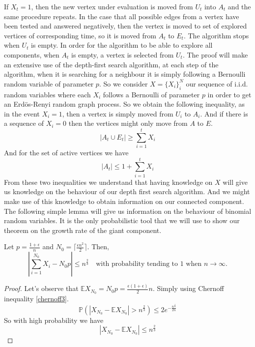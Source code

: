 If $X_t = 1$, then the new vertex under evaluation is moved from $U_t$ into $A_t$ and the same procedure repeats. 
In the case that all possible edges from a vertex have been tested and answered negatively, then the vertex is moved to set of explored vertices of corresponding time, so it is moved from $A_t$ to $E_t$.
The algorithm stops when $U_t$ is empty.
\newline
In order for the algorithm to be able to explore all components, when $A_t$ is empty, a vertex is selected from $U_t$.
\newline
The proof will make an extensive use of the depth-first search algorithm, at each step of the algorithm, when it is searching for a neighbour it is simply following a Bernoulli random variable of parameter $p$.
So we consider $X = \{X_i\}_i^N$ our sequence of i.i.d. random variables where each $X_i$ follows a Bernoulli of parameter $p$ in order to get an Erd\"os-Renyi random graph process.
So we obtain the following inequality, as in the event $X_i = 1$, then a vertex is simply moved from $U_i$ to $A_i$. And if there is a sequence of $X_i = 0$ then the vertices might only move from $A$ to $E$.  
\begin{equation}
	|A_t \cup E_t| \geq \sum_{i=1}^t X_i
\end{equation} 
And for the set of active vertices we have
\begin{equation}\label{eq:At}
	|A_t| \leq 1 + \sum_{i=1}^t X_i
\end{equation}
From these two inequalities we understand that having knowledge on $X$ will give us knowledge on the behaviour of our depth first search algorithm. And we might make use of this knowledge to obtain information on our connected component.
\newline
The following simple lemma will give us information on the behaviour of binomial random variables. It is the only probabilistic tool that we will use to show our theorem on the growth rate of the giant component.
\begin{lemma}\label{lemmaN0}
	Let $p = \frac{1+\epsilon}{n}$ and $N_0 = \lceil\frac{\epsilon n^2}{2}\rceil$. Then, 
	\begin{equation}
	|\sum_{i=1}^{N_0} X_{i} - N_0 p| \leq n^{\frac{2}{3}} \quad \text{with probability tending to 1 when $n\to \infty$.}
	\end{equation}
\end{lemma}
\begin{proof}
	Let's observe that $\mathbb{E}X_{N_0} = N_0 p = \frac{\epsilon(1+\epsilon)}{2}n$.
	Simply using Chernoff inequality \eqref{chernoff3}.
	\begin{equation}
		\mathbb{P}(|X_{N_0} - \mathbb{E}X_{N_0}| > n^{\frac{2}{3}} ) \leq 2 e^{-\frac{n^{\frac{4}{3}}}{2n}}
	\end{equation}
	So with high probability we have 
	\begin{equation}
		|X_{N_0} - \mathbb{E}X_{N_0}| \leq n^{\frac{2}{3}}
	\end{equation}
\end{proof}
